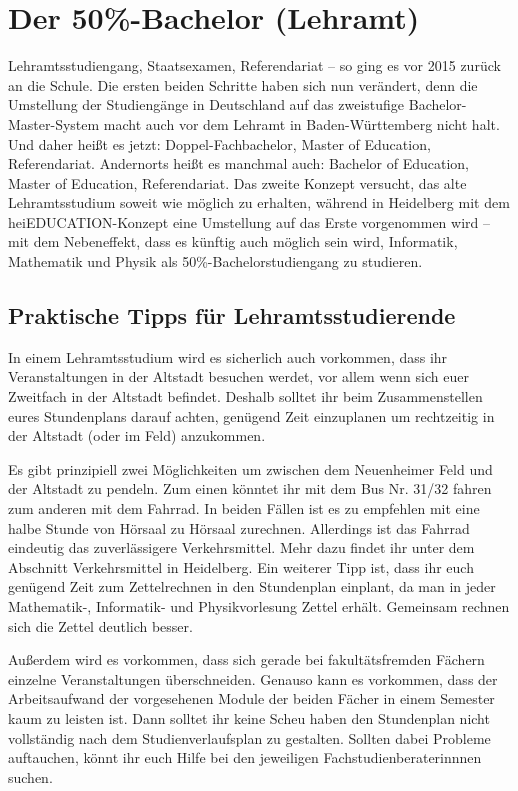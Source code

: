 
\section{Der 50\%-Bachelor (Lehramt)} %
\label{lehramt_allg}

Lehramtsstudiengang, Staatsexamen, Referendariat -- so ging es vor 2015 zurück an die Schule. Die ersten beiden Schritte haben sich nun verändert, denn die Umstellung der Studiengänge in Deutschland auf das zweistufige Bachelor-Master-System macht auch vor dem Lehramt in Baden-Württemberg nicht halt. Und daher heißt es jetzt: Doppel-Fachbachelor, Master of Education, Referendariat. Andernorts heißt es manchmal auch: Bachelor of Education, Master of Education, Referendariat. Das zweite Konzept versucht, das alte Lehramtsstudium soweit wie möglich zu erhalten, während in Heidelberg mit dem heiEDUCATION-Konzept eine Umstellung auf das Erste vorgenommen wird -- mit dem Nebeneffekt, dass es künftig auch möglich sein wird, Informatik, Mathematik und Physik als 50\%-Bachelorstudiengang zu studieren.

\subsection{Praktische Tipps für Lehramtsstudierende}
In einem Lehramtsstudium wird es sicherlich auch vorkommen, dass ihr Veranstaltungen in der Altstadt besuchen werdet, vor allem wenn sich euer Zweitfach in der Altstadt befindet. Deshalb solltet ihr beim Zusammenstellen eures Stundenplans darauf achten, genügend Zeit einzuplanen um rechtzeitig in der Altstadt (oder im Feld) anzukommen.

Es gibt prinzipiell zwei Möglichkeiten um zwischen dem Neuenheimer Feld und der Altstadt zu pendeln. Zum einen könntet ihr mit dem Bus Nr. 31/32  fahren zum anderen mit dem Fahrrad. In beiden Fällen ist es zu empfehlen mit eine halbe Stunde von Hörsaal zu Hörsaal zurechnen. Allerdings ist das Fahrrad eindeutig das zuverlässigere Verkehrsmittel. Mehr dazu findet ihr unter dem Abschnitt Verkehrsmittel in Heidelberg. 
Ein weiterer Tipp ist, dass ihr euch genügend Zeit zum Zettelrechnen in den Stundenplan einplant, da man in jeder Mathematik-, Informatik- und Physikvorlesung Zettel erhält. Gemeinsam rechnen sich die Zettel deutlich besser. 

Außerdem wird es vorkommen, dass sich gerade bei fakultätsfremden Fächern einzelne Veranstaltungen überschneiden. Genauso kann es vorkommen, dass der Arbeitsaufwand der vorgesehenen Module der beiden Fächer in einem Semester kaum zu leisten ist. Dann solltet ihr keine Scheu haben den Stundenplan nicht vollständig nach dem Studienverlaufsplan zu gestalten. Sollten dabei Probleme auftauchen, könnt ihr euch Hilfe bei den jeweiligen Fachstudienberaterinnnen suchen.


